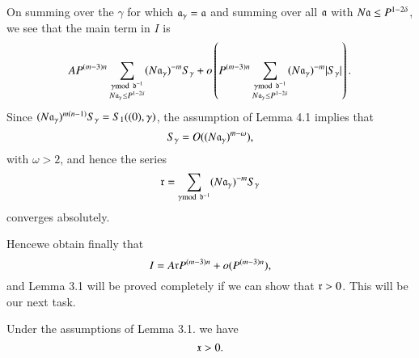On summing over the $\gamma$ for which $\mathfrak{a}_\gamma = \mathfrak{a}$ and summing over all $\mathfrak{a}$ with $N\mathfrak{a} \leq P^{1-2 \delta}$, we see that the main term in $I$ is
$$
AP^{(m-3)n} \sum\limits_{\substack{\gamma {\rm{mod}}\kern.3em \mathfrak{d}^{-1}\\ N \mathfrak{a}_\gamma \leq P^{1-2\delta}}} (N\mathfrak{a}_\gamma)^{-m} S_\gamma + o \left(P^{(m-3)n} \sum\limits_{\substack{\gamma {\rm{mod}}\kern.3em \mathfrak{d}^{-1}\\ N\mathfrak{a}_\gamma \leq P^{1-2\delta}}} (N\mathfrak{a}_\gamma)^{-m} |S_\gamma|  \right).
$$
Since $(N\mathfrak{a}_\gamma)^{m(n-1)} S_\gamma = S_1 ((0), \gamma)$, the assumption of Lemma 4.1 implies that 
$$
S_\gamma = O((N\mathfrak{a}_\gamma)^{m-\omega}),
$$
with $\omega >2$, and hence the series
$$
\mathfrak{r} = \sum\limits_{\gamma {\rm{mod}}\kern.3em \mathfrak{d}^{-1}} (N\mathfrak{a}_\gamma)^{-m} S_\gamma
$$
converges absolutely.

Hence\pageoriginale we obtain finally that
$$
I = A \mathfrak{r} P^{(m-3)n} + o(P^{(m-3)n}),
$$
and Lemma 3.1 will be proved completely if we can show that $\mathfrak{r} >0$. This will be our next task.

\begin{lemma}%
Under the assumptions of Lemma 3.1. we have
$$
\mathfrak{x} > 0.
$$
\end{lemma}

